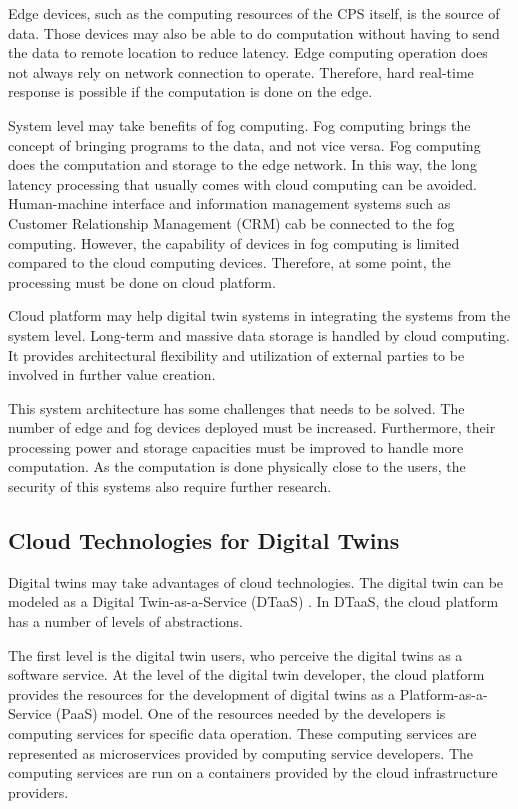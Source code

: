 \documentclass[article]{aaltoseries}
\begin{document}
Edge devices, such as the computing resources of the CPS itself, is the source of data. Those devices may also be able to do computation without having to send the data to remote location to reduce latency. Edge computing operation does not always rely on network connection to operate. Therefore, hard real-time response is possible if the computation is done on the edge.

System level may take benefits of fog computing. Fog computing brings the concept of bringing programs to the data, and not vice versa. Fog computing does the computation and storage to the edge network. In this way, the long latency processing that usually comes with cloud computing can be avoided. Human-machine interface and information management systems such as Customer Relationship Management (CRM) cab be connected to the fog computing. However, the capability of devices in fog computing is limited compared to the cloud computing devices. Therefore, at some point, the processing must be done on cloud platform. 

Cloud platform may help digital twin systems in integrating the systems from the system level. Long-term and massive data storage is handled by cloud computing. It provides architectural flexibility and utilization of external parties to be involved in further value creation.

This system architecture has some challenges that needs to be solved. The number of edge and fog devices deployed must be increased. Furthermore, their processing power and storage capacities must be improved to handle more computation. As the computation is done physically close to the users, the security of this systems also require further research.

\subsection{Cloud Technologies for Digital Twins}
Digital twins may take advantages of cloud technologies. The digital twin can be modeled as a Digital Twin-as-a-Service (DTaaS) \cite{borodulin2017towards}. In DTaaS, the cloud platform has a number of levels of abstractions. 

The first level is the digital twin users, who perceive the digital twins as a software service. At the level of the digital twin developer, the cloud platform provides the resources for the development of digital twins as a Platform-as-a-Service (PaaS) model. One of the resources needed by the developers is computing services for specific data operation. These computing services are represented as microservices provided by computing service developers. The computing services are run on a containers provided by the cloud infrastructure providers.
\end{document}

